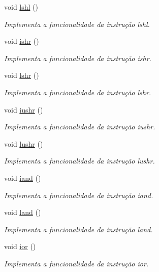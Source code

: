 \begin{DoxyCompactItemize}
void \hyperlink{classOperations_a9d2b2a5ea74f26e6a5005ec9e99b24d9}{lshl} ()
\begin{DoxyCompactList}\small\item\em Implementa a funcionalidade da instrução lshl. \end{DoxyCompactList}\item 
void \hyperlink{classOperations_aa67d92582121939b307658d417b34d3c}{ishr} ()
\begin{DoxyCompactList}\small\item\em Implementa a funcionalidade da instrução ishr. \end{DoxyCompactList}\item 
void \hyperlink{classOperations_aa886b0d027fb5b030016af6100541e81}{lshr} ()
\begin{DoxyCompactList}\small\item\em Implementa a funcionalidade da instrução lshr. \end{DoxyCompactList}\item 
void \hyperlink{classOperations_ae3ab5ae36e587a47832886fdf4f8b2a6}{iushr} ()
\begin{DoxyCompactList}\small\item\em Implementa a funcionalidade da instrução iushr. \end{DoxyCompactList}\item 
void \hyperlink{classOperations_a3b7c61f8bca7b3ad0dacae6649aee042}{lushr} ()
\begin{DoxyCompactList}\small\item\em Implementa a funcionalidade da instrução lushr. \end{DoxyCompactList}\item 
void \hyperlink{classOperations_a8761c078ea80677ea82a43ab278e76b5}{iand} ()
\begin{DoxyCompactList}\small\item\em Implementa a funcionalidade da instrução iand. \end{DoxyCompactList}\item 
void \hyperlink{classOperations_a6104d728be025abb71570139b988ed4e}{land} ()
\begin{DoxyCompactList}\small\item\em Implementa a funcionalidade da instrução land. \end{DoxyCompactList}\item 
void \hyperlink{classOperations_aaa890c310bc7a93e97b2c5004df94e70}{ior} ()
\begin{DoxyCompactList}\small\item\em Implementa a funcionalidade da instrução ior. \end{DoxyCompactList}\item 

\end{DoxyCompactItemize}
